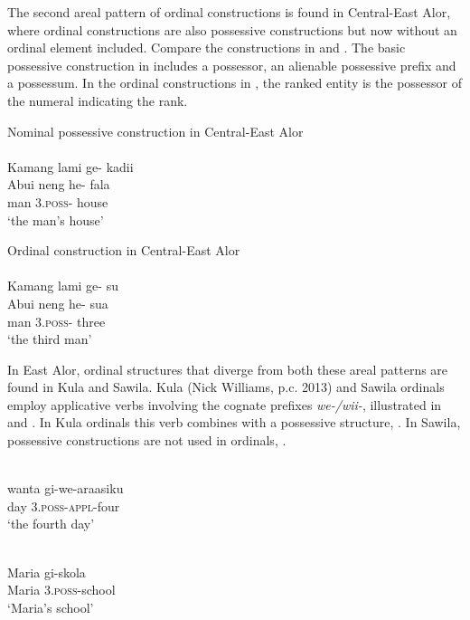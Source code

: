 \documentclass[output=paper]{LSP/langsci}
\begin{document}
The second areal pattern of ordinal constructions is found in Central-East Alor, where ordinal constructions are also possessive constructions but now without an ordinal element included. Compare the constructions in  and . The basic possessive construction in  includes a possessor, an alienable possessive prefix and a possessum. In the ordinal constructions in , the ranked entity is the possessor of the numeral indicating the rank.

\ea%
\label{bkm:Ref342649962}
   Nominal possessive construction in Central-East Alor \\
\langinfo{}{}{}\\
\glll  Kamang  lami  ge-  kadii \\  
     Abui     neng  he-  fala  \\
     {}      man  3\textsc{.poss- } house\\
 \glt `the man's house'
\z

\ea%
\label{bkm:Ref342309284}
    Ordinal construction in Central-East Alor\\
\langinfo{}{}{}\\
\glll Kamang   lami  ge- su \\  
    Abui     neng  he-  sua   \\
    { }  man  3\textsc{.poss-}  three\\
\glt  `the third man'
\z 


In East Alor, ordinal structures that diverge from both these areal patterns are found in Kula and Sawila. Kula (Nick Williams, p.c. 2013) and Sawila ordinals employ applicative verbs involving the cognate prefixes \textit{we-/wii-}, illustrated in  and . In Kula ordinals this verb combines with a possessive structure, . In Sawila, possessive constructions  are not used in ordinals, . 


\ea%
\label{bkm:Ref355275027}
 
\\
\gll wanta   gi-we-araasiku\\  
  day   3.\textsc{poss}{}-\textsc{appl}{}-four  \\
\glt  `the fourth day'
\z
 

\ea%
\label{bkm:Ref358037937}
\\
\gll Maria   gi-skola\\  
   Maria   3.\textsc{poss-}school \\
\glt`Maria's school'
\z
 
\end{document}
